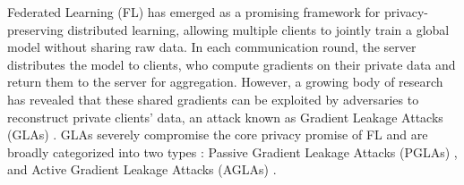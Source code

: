 
Federated Learning (FL) \cite{mcmahan2017communication, Towardsk, chilimbi2014project} has emerged as a promising framework for privacy-preserving distributed learning, allowing multiple clients to jointly train a global model without sharing raw data. In each communication round, the server distributes the model to clients, who compute gradients on their private data and return them to the server for aggregation. However, a growing body of research has revealed that these shared gradients can be exploited by adversaries to reconstruct private clients' data, an attack known as Gradient Leakage Attacks (GLAs) \cite{zhu2019deep}. GLAs severely compromise the core privacy promise of FL and are broadly categorized into two types \cite{nowak2024qbi}: Passive Gradient Leakage Attacks (PGLAs) \cite{RGAP, yang2022using, 285479}, and Active Gradient Leakage Attacks (AGLAs) \cite{boenisch2023curious, zhao2023loki, fowl2021robbing, nowak2024qbi}.



